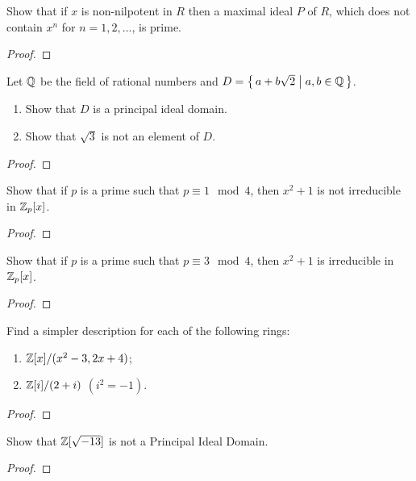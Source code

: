 \begin{problem}
  Show that if $x$ is non-nilpotent in $R$ then a maximal ideal
  $P$ of $R$, which does not contain $x^n$ for $n=1,2,...$, is
  prime.
\end{problem}
\begin{proof}
\end{proof}

\begin{problem}
  Let $\mathbb{Q}$ be the field of rational numbers and
  $D=\left\{\,a+b\sqrt{2}\;\middle|\;a,b\in\mathbb{Q}\,\right\}$.
  \begin{enumerate}[label=(\alph*)]
  \item Show that $D$ is a principal ideal domain.
  \item Show that $\sqrt{3}$ is not an element of $D$.
  \end{enumerate}
\end{problem}
\begin{proof}
\end{proof}

\begin{problem}
  Show that if $p$ is a prime such that $p\equiv 1\mod 4$, then
  $x^2+1$ is not irreducible in $\mathbb{Z}_p[x]$.
\end{problem}
\begin{proof}
\end{proof}

\begin{problem}
  Show that if $p$ is a prime such that $p\equiv 3\mod 4$, then
  $x^2+1$ is irreducible in $\mathbb{Z}_p[x]$.
\end{problem}
\begin{proof}
\end{proof}

\begin{problem}
  Find a simpler description for each of the following rings:
  \begin{enumerate}
  \item $\mathbb{Z}[x]/(x^2-3,2x+4)$;
  \item $\mathbb{Z}[i]/(2+i)$ $(i^2=-1)$.
  \end{enumerate}
\end{problem}
\begin{proof}
\end{proof}

\begin{problem}
  Show that $\mathbb{Z}[\sqrt{-13}]$ is not a Principal Ideal Domain.
\end{problem}
\begin{proof}
\end{proof}

